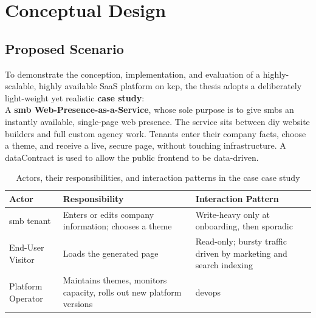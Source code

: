 \documentclass[11pt, a4paper, oneside, listof=totoc]{scrartcl}
\begin{document}
            \cleardoublepage

    \section{Conceptual Design}\label{sec:concept}

        \subsection{Proposed Scenario}\label{subsec:scenario}
            To demonstrate the conception, implementation, and evaluation of a highly-scalable, 
            highly available SaaS platform on \gls{kcp}, the thesis adopts a deliberately
            light-weight yet realistic \textbf{case study}:
            \\
            A \textbf{\gls{smb} Web-Presence-as-a-Service}, whose sole purpose is to give
            \glspl{smb} an instantly available, single-page web presence.
            The service sits between \gls{diy} website builders and full custom agency work.
            Tenants enter their company facts, choose a theme, and receive a live, secure page,
            without touching infrastructure.
            A \gls{dataContract} is used to allow the public frontend to be data-driven.
            
            \begin{table}[H]
                \centering
                \renewcommand{\arraystretch}{1.5}
                \begin{tabular}{lP{4cm}P{8cm}}
                    \toprule
                    Actor & Responsibility & Interaction Pattern \\
                    \midrule
                    \gls{smb} tenant & Enters or edits company information; chooses a theme & Write-heavy only at onboarding, then sporadic \\
                    End-User Visitor & Loads the generated page & Read-only; bursty traffic driven by marketing and search indexing \\
                    Platform Operator & Maintains themes, monitors capacity, rolls out new platform versions & \Gls{devops} \\
                    \bottomrule
                \end{tabular}
                \caption{Actors, their responsibilities, and interaction patterns in the case case study}\label{tab:scenario}
            \end{table}
            
\end{document}
